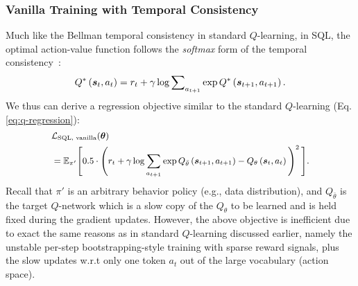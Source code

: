\subsubsection{Vanilla Training with Temporal Consistency}
\label{appendix-subsubsec:vanilla-training-with-temporal-consistency}
Much like the Bellman temporal consistency in standard $Q$-learning, in SQL, the optimal action-value function follows the \emph{softmax} form of the temporal consistency~\citep{ziebart2008maximum,ziebart2010modeling,fox2016taming,nachum2017bridging}:
\begin{equation}
\small
    Q^{*}\left(\bm{s}_{t}, a_{t}\right) =r_{t} + \gamma \log \sum\nolimits_{a_{t+1}} \exp Q^*\left(\bm{s}_{t+1}, a_{t+1}\right) .
    \label{eq:q-and-next-v}
\end{equation}
We thus can derive a regression objective similar to the standard $Q$-learning (Eq.\ref{eq:q-regression}):
\begin{equation}
\small
\begin{aligned}
&\loss_{\text{SQL, vanilla}} (\bm{\theta}) \\
&= \mathbb{E}_{\pi'} \Bigg[ 0.5 \cdot \Bigg( r_t + \gamma \log \sum_{a_{t+1}} \exp Q_{\bar{{\theta}}}\left(\bm{s}_{t+1}, a_{t+1}\right) - Q_{{\theta}}\left(\bm{s}_{t}, a_{t}\right)\Bigg)^{2}\,\Bigg].
\label{eq:optimal-Q-2}
\end{aligned}
\end{equation}
Recall that $\pi'$ is an arbitrary behavior policy (e.g., data distribution), and $Q_{\bar{{\theta}}}$ is the target $Q$-network which is a slow copy of the $Q_\theta$ to be learned and is held fixed during the gradient updates. However, the above objective is inefficient due to exact the same reasons as in standard $Q$-learning discussed earlier, namely the unstable per-step bootstrapping-style training with sparse reward signals, plus the slow updates w.r.t only one token $a_t$ out of the large vocabulary (action space).
